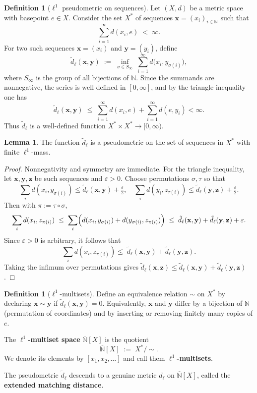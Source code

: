 \documentclass[10pt,a4paper]{article}
\theoremstyle{definition}
\newtheorem{definition}[theorem]{Definition}
\newtheorem{lemma}[theorem]{Lemma}
\newcommand{\N}{\mathbb{N}}
\begin{document}
\begin{definition}[$\ell^1$ pseudometric on sequences]\label{def:l1_pseudometric}
Let $(X,d)$ be a metric space with basepoint $e\in X$.
Consider the set $X^\ast$ of sequences $\mathbf{x}=(x_i)_{i\in\mathbb{N}}$
such that
\[
\sum_{i=1}^\infty d(x_i,e) \;<\; \infty.
\]
For two such sequences $\mathbf{x}=(x_i)$ and $\mathbf{y}=(y_i)$, define
\[
\tilde d_\ell(\mathbf{x},\mathbf{y})
\;:=\;
\inf_{\sigma \in S_\infty}\;
\sum_{i=1}^\infty d\bigl(x_i,y_{\sigma(i)}\bigr),
\]
where $S_\infty$ is the group of all bijections of $\mathbb{N}$.
Since the summands are nonnegative, the series is well defined in $[0,\infty]$,
and by the triangle inequality one has
\[
\tilde d_\ell(\mathbf{x},\mathbf{y})
\;\leq\;
\sum_{i=1}^\infty d(x_i,e) + \sum_{i=1}^\infty d(e,y_i) < \infty.
\]
Thus $\tilde d_\ell$ is a well-defined function
$X^\ast \times X^\ast \to [0,\infty)$.
\end{definition}

\begin{lemma}\label{lem:l1_pseudometric}
The function $\tilde d_\ell$ is a pseudometric on the set of sequences in $X^\ast$
with finite $\ell^1$-mass.
\end{lemma}

\begin{proof}
Nonnegativity and symmetry are immediate.  
For the triangle inequality, let $\mathbf{x},\mathbf{y},\mathbf{z}$ be such sequences and $\varepsilon>0$.
Choose permutations $\sigma,\tau$ so that
\[
\sum_i d(x_i,y_{\sigma(i)}) \leq \tilde d_\ell(\mathbf{x},\mathbf{y}) + \tfrac{\varepsilon}{2},\quad
\sum_i d(y_i,z_{\tau(i)}) \leq \tilde d_\ell(\mathbf{y},\mathbf{z}) + \tfrac{\varepsilon}{2}.
\]
Then with $\pi := \tau \circ \sigma$,
\[
\sum_i d(x_i,z_{\pi(i)})
\;\leq\;
\sum_i \Bigl( d(x_i,y_{\sigma(i)}) + d(y_{\sigma(i)},z_{\pi(i)}) \Bigr)
\;\leq\; \tilde d_\ell(\mathbf{x},\mathbf{y}) + \tilde d_\ell(\mathbf{y},\mathbf{z}) + \varepsilon.
\]
Since $\varepsilon >0$ is arbitrary, it follows that
\[
\sum_i d(x_i,z_{\pi(i)}) \leq\; \tilde d_\ell(\mathbf{x},\mathbf{y}) + \tilde d_\ell(\mathbf{y},\mathbf{z}).
\]
Taking the infimum over permutations gives
$\tilde d_\ell(\mathbf{x},\mathbf{z}) \leq \tilde d_\ell(\mathbf{x},\mathbf{y}) + \tilde d_\ell(\mathbf{y},\mathbf{z})$.
\end{proof}

\begin{definition}[$\ell^1$-multisets]\label{def:complete_criterion}
Define an equivalence relation $\sim$ on $X^\ast$ by declaring
$\mathbf{x} \sim \mathbf{y}$ if $\tilde d_\ell(\mathbf{x},\mathbf{y})=0$.
Equivalently, $\mathbf{x}$ and $\mathbf{y}$ differ by a bijection of $\mathbb{N}$
(permutation of coordinates) and by inserting or removing finitely many copies of $e$.

The \textbf{$\ell^1$-multiset space} $\overline{\N}[X]$ is the quotient
\[
\overline{\N}[X] \;:=\; X^\ast / \sim.
\]
We denote its elements by $[x_1,x_2,\dots]$ and call them \textbf{$\ell^1$-multisets}.

The pseudometric $\tilde d_\ell$ descends to a genuine metric $d_\ell$ on $\overline{\N}[X]$, called the
\textbf{extended matching distance}.
\end{definition}
\end{document}
